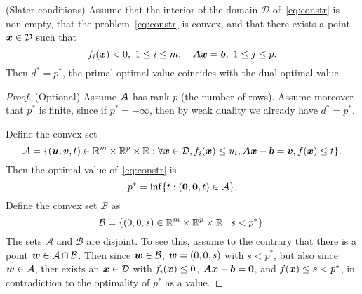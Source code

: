 \begin{theorem}(Slater conditions)
 Assume that the interior of the domain $\mathcal{D}$ of~\eqref{eq:constr} is non-empty, that the problem~\eqref{eq:constr} is convex, and that there exists a point $\bm{x}\in \mathcal{D}$ such that 
 \begin{equation*}
  f_i(\bm{x})<0, \ 1\leq i\leq m, \quad \bm{A}\bm{x}=\bm{b}, \ 1\leq j\leq p.
 \end{equation*}
Then $d^*=p^*$, the primal optimal value coincides with the dual optimal value.
\end{theorem}

\begin{proof}(Optional)
 Assume $\bm{A}$ has rank $p$ (the number of rows). Assume moreover that $p^*$ is finite, since if $p^*=-\infty$, then by weak duality we already have $d^*=p^*$. 
 
 Define the convex set
 \begin{equation*}
  \mathcal{A} = \{(\bm{u},\bm{v},t)\in \mathbb{R}^m\times \mathbb{R}^{p}\times \mathbb{R} \mathrel{\mathop{:}} \forall \bm{x}\in \mathcal{D}, f_i(\bm{x})\leq u_i, \bm{A}\bm{x}-\bm{b}=\bm{v}, f(\bm{x})\leq t\}.
 \end{equation*}
Then the optimal value of~\eqref{eq:constr} is
\begin{equation*}
 p^* = \inf \{t \mathrel{\mathop{:}} (\bm{0},\bm{0},t)\in \mathcal{A}\}.
\end{equation*}
Define the convex set $\mathcal{B}$ as
\begin{equation*}
 \mathcal{B} = \{(0,0,s)\in \mathbb{R}^m\times \mathbb{R}^p\times \mathbb{R} \mathrel{\mathop{:}} s<p^*\}.
\end{equation*}
The sets $\mathcal{A}$ and $\mathcal{B}$ are disjoint. To see this, assume to the contrary that there is a point $\bm{w}\in \mathcal{A}\cap \mathcal{B}$. Then since $\bm{w}\in \mathcal{B}$, $\bm{w}=(0,0,s)$ with $s<p^*$, but also since $\bm{w}\in \mathcal{A}$, ther exists an $\bm{x}\in \mathcal{D}$ with $f_i(\bm{x})\leq 0$, $\bm{A}\bm{x}-\bm{b}=\bm{0}$, and $f(\bm{x})\leq s<p^*$, in contradiction to the optimality of $p^*$ as a value.


\end{proof}
